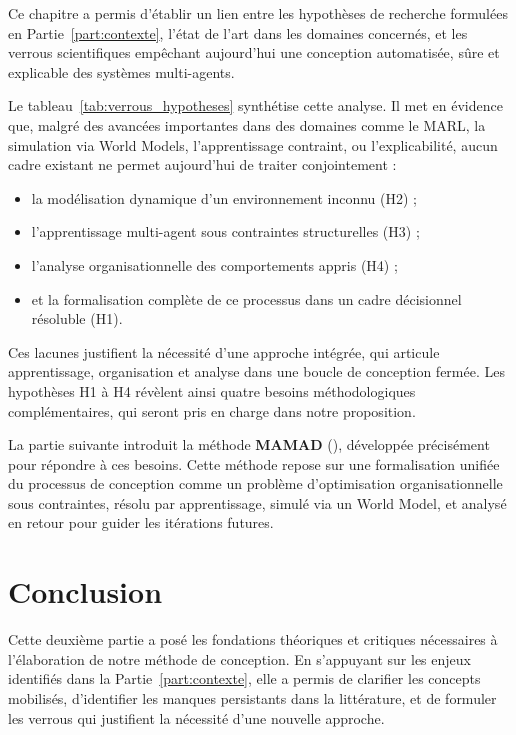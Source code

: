 \noindent
Ce chapitre a permis d'établir un lien entre les hypothèses de recherche formulées en Partie~\autoref{part:contexte}, l'état de l'art dans les domaines concernés, et les verrous scientifiques empêchant aujourd'hui une conception automatisée, sûre et explicable des systèmes multi-agents.

\medskip

\noindent
Le tableau~\autoref{tab:verrous_hypotheses} synthétise cette analyse. Il met en évidence que, malgré des avancées importantes dans des domaines comme le \ac{MARL}, la simulation via World Models, l'apprentissage contraint, ou l'explicabilité, aucun cadre existant ne permet aujourd'hui de traiter conjointement :
\begin{itemize}
    \item la modélisation dynamique d'un environnement inconnu (H2) ;
    \item l'apprentissage multi-agent sous contraintes structurelles (H3) ;
    \item l'analyse organisationnelle des comportements appris (H4) ;
    \item et la formalisation complète de ce processus dans un cadre décisionnel résoluble (H1).
\end{itemize}

\noindent
Ces lacunes justifient la nécessité d'une approche intégrée, qui articule apprentissage, organisation et analyse dans une boucle de conception fermée. Les hypothèses H1 à H4 révèlent ainsi quatre besoins méthodologiques complémentaires, qui seront pris en charge dans notre proposition.

\medskip

\noindent
La partie suivante introduit la méthode \textbf{\ac{MAMAD}} (), développée précisément pour répondre à ces besoins. Cette méthode repose sur une formalisation unifiée du processus de conception comme un problème d'optimisation organisationnelle sous contraintes, résolu par apprentissage, simulé via un World Model, et analysé en retour pour guider les itérations futures.





\chapter*{Conclusion}

\noindent
Cette deuxième partie a posé les fondations théoriques et critiques nécessaires à l'élaboration de notre méthode de conception. En s'appuyant sur les enjeux identifiés dans la Partie~\autoref{part:contexte}, elle a permis de clarifier les concepts mobilisés, d'identifier les manques persistants dans la littérature, et de formuler les verrous qui justifient la nécessité d'une nouvelle approche.

